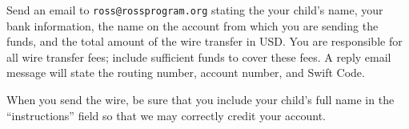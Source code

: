 \documentclass[11pt]{ross}
\begin{document}
Send an email to \texttt{ross@rossprogram.org} stating the your
child's name, your bank information, the name on the account from
which you are sending the funds, and the total amount of the wire
transfer in USD. You are responsible for all wire transfer fees;
include sufficient funds to cover these fees.  A reply email message
will state the routing number, account number, and Swift Code.

When you send the wire, be sure that you include your child's full
name in the ``instructions'' field so that we may correctly credit
your account.
\end{document}
